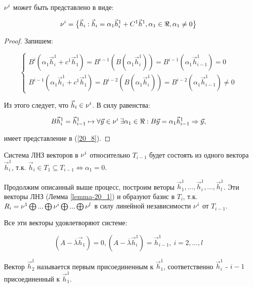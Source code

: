 \begin{proposition}
$\nu^i$ может быть представлено в виде: 

\begin{equation}\label{20_8}
\nu^i = \big\lbrace \vec{h}_i: \vec{h}_i = \alpha_1 \vec{h}_i^1 + C^1 \vec{h}^1, \alpha_1 \in \Re , \alpha_1 \neq 0 \big\rbrace
\end{equation}

\begin{proof}

Запишем:

\begin{equation*}
\begin{cases}
B^i ( \alpha_1\vec{h}_i^1 + c^1 \vec{h}_1^1) = B^{i - 1} (B(\alpha_1 \vec{h}_i^1 )) = B^{i - 1} (\alpha_1 \vec{h}_{i-1}^1) = 0 \\
B^{i-1} ( \alpha_1\vec{h}_i^1 + c^1 \vec{h}_1^1) = B^{i - 2} (B(\alpha_1 \vec{h}_i^1 )) = B^{i - 2} (\alpha_1 \vec{h}_{i-1}^1) \neq 0
\end{cases}
\end{equation*}

Из этого следует, что $\vec{h}_i \in \nu^i$. В силу равенства:

\[B\vec{h}_i^1 = \vec{h}_{i-1}^1 \mapsto \forall \vec{y} \in \nu^i \: \exists \alpha_1 \in \Re : B\vec{y} = \alpha_1\vec{h}_{i-1}^1 \Rightarrow \vec{y},\]

имеет представление в (\ref{20_8}).
\end{proof}
\end{proposition}

Система ЛНЗ векторов в $\nu^i$ относительно $T_{i-1}$ будет состоять из одного вектора $\vec{h}_i^1$, т.к. $\vec{h}_i \in T_1 \subseteq T_{i - 1} \Leftrightarrow \alpha_1 = 0$.

Продолжим описанный выше процесс, построим веторы $\vec{h}_1^1, ... , \vec{h}_i^1 , ... , \vec{h}_l^1$. Эти векторы ЛНЗ (Лемма \ref{lemma-20_1}) и образуют базис в $T_i$, т.к. $R_i = \nu^1 \bigoplus ... \bigoplus \nu^i \bigoplus ... \bigoplus \nu^l$ в силу линейной независимости $\nu^i$ от $T_{i - 1}$.

Все эти векторы удовлетворяют системе:

\begin{equation}\label{20_9}
(A - \overline{\lambda} \vec{h}_1) = 0, (A - \overline{\lambda} \vec{h}_i^1) = \vec{h}_{i-1}^1, \: i = 2,...,l 
\end{equation}

Вектор $\vec{h}_2^1$ называется первым присоединенным к $\vec{h}_1^1$, соответственно $\vec{h}_i^1$ - $i-1$ присоединенный к $\vec{h}_1^1$.

